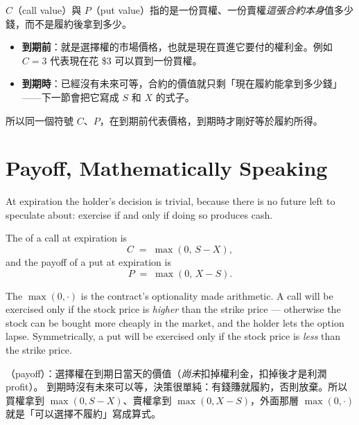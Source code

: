 \suppstart
\begin{remark}
	$C$（call value）與 $P$（put value）指的是一份買權、一份賣權\emph{這張合約本身}值多少錢，而不是履約後拿到多少。
	\begin{itemize}[nosep]
		\item \textbf{到期前}：就是選擇權的市場價格，也就是現在買進它要付的權利金。例如 $C=3$ 代表現在花 \$3 可以買到一份買權。
		\item \textbf{到期時}：已經沒有未來可等，合約的價值就只剩「現在履約能拿到多少錢」——下一節會把它寫成 $S$ 和 $X$ 的式子。
	\end{itemize}
	所以同一個符號 $C$、$P$，在到期前代表價格，到期時才剛好等於履約所得。
\end{remark}
\suppend

\section{Payoff, Mathematically Speaking}
\label{sec:payoff}


At expiration the holder's decision is trivial, because there is no future left to speculate about: exercise if and only if doing so produces cash.

\begin{definition}
	The  of a call at expiration is
	\begin{equation}
		C \;=\; \max(0,\, S-X) ,
		\label{eq:call-payoff}
	\end{equation}
	and the payoff of a put at expiration is
	\begin{equation}
		P \;=\; \max(0,\, X-S) .
		\label{eq:put-payoff}
	\end{equation}
\end{definition}

The $\max(0,\cdot)$ is the contract's optionality made arithmetic.
A call will be exercised only if the stock price is \emph{higher} than the strike price --- otherwise the stock can be bought more cheaply in the market, and the holder lets the option lapse.
Symmetrically, a put will be exercised only if the stock price is \emph{less} than the strike price.

\suppstart
\begin{remark}
	（payoff）：選擇權在到期日當天的價值（\emph{尚未}扣掉權利金，扣掉後才是利潤 profit）。
	到期時沒有未來可以等，決策很單純：有錢賺就履約，否則放棄。所以買權拿到 $\max(0,S-X)$、賣權拿到 $\max(0,X-S)$，外面那層 $\max(0,\cdot)$ 就是「可以選擇不履約」寫成算式。
\end{remark}
\suppend

